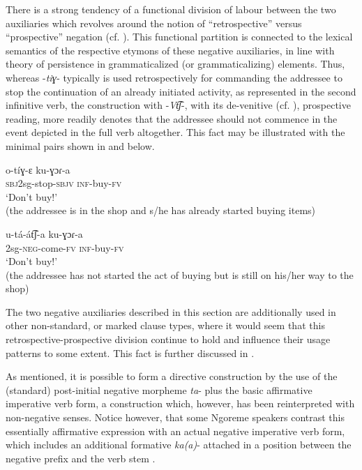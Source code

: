 \documentclass[output=paper,colorlinks,citecolor=brown,draftmode]{langscibook}
\begin{document}
There is a strong tendency of a functional division of labour between the two auxiliaries which revolves around the notion of “retrospective” versus “prospective” negation (cf. \citealt{Auwera2010}). This functional partition is connected to the lexical semantics of the respective etymons of these negative auxiliaries, in line with  theory of persistence in grammaticalized (or grammaticalizing) elements. Thus, whereas \nobreakdash-\textit{tiɣ}\nobreakdash- typically is used retrospectively for commanding the addressee to stop the continuation of an already initiated activity, as represented in the second infinitive verb, the construction with \nobreakdash-\textit{Vt͡ʃ}\nobreakdash-, with its de-venitive (cf. \citealt{Dahl2000}), prospective reading, more readily denotes that the addressee should not commence in the event depicted in the full verb altogether. This fact may be illustrated with the minimal pairs shown in  and  below.

\ea\label{ex:ngo:24} 
    \gll o-tíɣ{}-ɛ ku-ɣɔɾ{}-a\\ 
     \textsc{sbj}2sg-stop-\textsc{sbjv} \textsc{inf}{}-buy-\textsc{fv}\\
    \glt ‘Don’t buy!’\\ (the addressee is in the shop and s/he has already started buying items)
\z 

\ea\label{ex:ngo:25} 
    \gll u-tá-át͡ʃ-a ku-ɣɔɾ{}-a\\ 
        2sg-\textsc{neg}{}-come-\textsc{fv} \textsc{inf}{}-buy-\textsc{fv}\\
    \glt ‘Don’t buy!’ \\ (the addressee has not started the act of buying but is still on his/her way to the shop) 
\z 

The two negative auxiliaries described in this section are additionally used in other non-standard, or marked clause types, where it would seem that this retrospective-prospective division continue to hold and influence their usage patterns to some extent. This fact is further discussed in . 

As mentioned, it is possible to form a directive construction by the use of the (standard) post-initial negative morpheme \textit{ta}{}- plus the basic affirmative imperative verb form, a construction which, however, has been reinterpreted with non-negative senses. Notice however, that some Ngoreme speakers contrast this essentially affirmative expression with an actual negative imperative verb form, which includes an additional formative \textit{ka(a)}\nobreakdash- attached in a position between the negative prefix and the verb stem .
\end{document}
